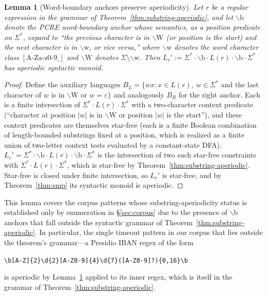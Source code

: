 \documentclass[letterpaper,twocolumn,10pt]{article}
\newtheorem{lemma}[theorem]{Lemma}
\theoremstyle{definition}
\theoremstyle{remark}
\newcommand{\wb}{\ensuremath{\backslash\mathrm{b}}}
\newcommand{\wbw}{\ensuremath{\backslash\mathrm{w}}}
\newcommand{\wbW}{\ensuremath{\backslash\mathrm{W}}}
\begin{document}
\begin{lemma}[Word-boundary anchors preserve aperiodicity]\label{lem:word-boundary}
Let $r$ be a regular expression in the grammar of Theorem~\ref{thm:substring-aperiodic},
and let \wb{} denote the PCRE word-boundary anchor whose semantics, as a
position predicate on $\Sigma^*$, expand to ``the previous character is in
\wbW{} (or position is the start) and the next character is in \wbw{}, or
vice versa,'' where \wbw{} denotes the word character class
$[\mathrm{A\text{-}Za\text{-}z0\text{-}9\_}]$ and \wbW{} denotes
$\Sigma \setminus \wbw$.
Then $L_r' := \Sigma^* \cdot \wb \cdot L(r) \cdot \wb \cdot \Sigma^*$ has aperiodic
syntactic monoid.
\end{lemma}
\begin{proof}
Define the auxiliary languages
$B_L = \{w x : x \in L(r),\ w \in \Sigma^*$ and the last character of $w$
is in \wbW{} or $w = \varepsilon\}$ and analogously
$B_R$ for the right anchor.
Each is a finite intersection of $\Sigma^* \cdot L(r) \cdot \Sigma^*$ with a
two-character context predicate (``character at position $|w|$ is in \wbW{} or
position $|w|$ is the start''), and these context predicates are themselves
star-free (each is a finite Boolean combination of length-bounded substrings
fixed at a position, which is realized as a finite union of two-letter
context tests evaluated by a constant-state DFA).
$L_r' = \Sigma^* \cdot \wb \cdot L(r) \cdot \wb \cdot \Sigma^*$ is the
intersection of two such star-free constraints with $\Sigma^* \cdot L(r) \cdot \Sigma^*$,
which is star-free by Theorem~\ref{thm:substring-aperiodic}.
Star-free is closed under finite intersection, so $L_r'$ is star-free, and by
Theorem~\ref{thm:smp} its syntactic monoid is aperiodic.
\end{proof}

This lemma covers the corpus patterns whose substring-aperiodicity status is
established only by enumeration in \S\ref{sec:corpus} due to the presence of
\wb{} anchors that fall outside the syntactic grammar of
Theorem~\ref{thm:substring-aperiodic}.
In particular, the single timeout pattern in our corpus that lies outside the
theorem's grammar---a Presidio IBAN regex of the form
\begin{center}
\small\texttt{\textbackslash{}b[A-Z]\{2\}\textbackslash{}d\{2\}[A-Z0-9]\{4\}\-\textbackslash{}d\{7\}([A-Z0-9]?)\{0,16\}\textbackslash{}b}
\end{center}
is aperiodic by Lemma~\ref{lem:word-boundary} applied to its inner regex,
which is itself in the grammar of Theorem~\ref{thm:substring-aperiodic}.
\end{document}
